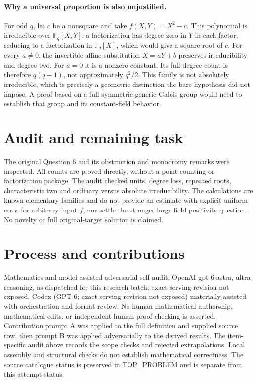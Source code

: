 \documentclass[11pt]{article}
\begin{document}
\paragraph{Why a universal proportion is also unjustified.}
For odd $q$, let $c$ be a nonsquare and take $f(X,Y)=X^2-c$.
This polynomial is irreducible over $\mathbb F_q[X,Y]$: a
factorization has degree zero in $Y$ in each factor, reducing to a
factorization in $\mathbb F_q[X]$, which would give a square root
of $c$. For every $a\ne0$, the invertible affine substitution
$X=aY+b$ preserves irreducibility and degree two. For $a=0$ it is
a nonzero constant. Its full-degree count is therefore $q(q-1)$,
not approximately $q^2/2$. This family is not absolutely irreducible,
which is precisely a geometric distinction the bare hypothesis did
not impose. A proof based on a full symmetric generic Galois group
would need to establish that group and its constant-field behavior.

\section{Audit and remaining task}
The original Question 6 and its obstruction and monodromy remarks were
inspected. All counts are proved directly, without a point-counting or
factorization package. The audit checked units, degree loss, repeated
roots, characteristic two and ordinary versus absolute irreducibility.
The calculations are known elementary families and do not provide an
estimate with explicit uniform error for arbitrary input $f$, nor
settle the stronger large-field positivity question. No novelty or
full original-target solution is claimed.

\section{Process and contributions}
Mathematics and model-assisted adversarial self-audit: OpenAI gpt-6-astra, ultra reasoning, as dispatched for this research batch; exact serving revision not exposed. Codex (GPT-6; exact serving revision not exposed) materially assisted with orchestration and format review. No human mathematical authorship, mathematical edits, or independent human proof checking is asserted.
Contribution prompt A was applied to the full definition and supplied source row, then prompt B was applied adversarially to the derived results. The item-specific audit above records the scope checks and rejected extrapolations. Local assembly and structural checks do not establish mathematical correctness. The source catalogue status is preserved in TOP\_PROBLEM and is separate from this attempt status.
\end{document}
